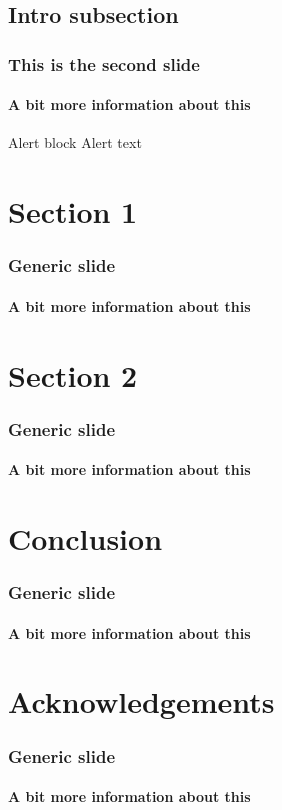 \documentclass[aspectratio=169]{beamer}
\begin{document}
    \subsection{Intro subsection}
    \begin{frame}
        \frametitle{This is the second slide}
        \framesubtitle{A bit more information about this}
        \begin{alertblock}{Alert block}
            Alert text
        \end{alertblock}
    \end{frame}

    \section{Section 1}

    \begin{frame}
        \frametitle{Generic slide}
        \framesubtitle{A bit more information about this}
    \end{frame}

    \section{Section 2}

    \begin{frame}
        \frametitle{Generic slide}
        \framesubtitle{A bit more information about this}
    \end{frame}


    \section{Conclusion}

    \begin{frame}
        \frametitle{Generic slide}
        \framesubtitle{A bit more information about this}
    \end{frame}

    \section{Acknowledgements}

    \begin{frame}
        \frametitle{Generic slide}
        \framesubtitle{A bit more information about this}
    \end{frame}

    \cernSplashWhite
\end{document}
